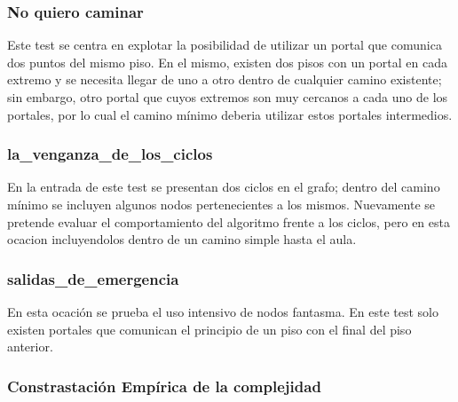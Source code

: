\subsubsection{No quiero caminar}
Este test se centra en explotar la posibilidad de utilizar un portal que comunica dos puntos del mismo piso. En el mismo, existen dos pisos con un portal en cada extremo y se necesita llegar de uno a otro dentro de cualquier camino existente; sin embargo, otro portal que cuyos extremos son muy cercanos a cada uno de los portales, por lo cual el camino mínimo deberia utilizar estos portales intermedios.

\subsubsection{la_venganza_de_los_ciclos}
En la entrada de este test se presentan dos ciclos en el grafo; dentro del camino mínimo se incluyen algunos nodos pertenecientes a los mismos. Nuevamente se pretende evaluar el comportamiento del algoritmo frente a los ciclos, pero en esta ocacion incluyendolos dentro de un camino simple hasta el aula.

\subsubsection{salidas_de_emergencia}
En esta ocación se prueba el uso intensivo de nodos fantasma. En este test solo existen portales que comunican el principio de un piso con el final del piso anterior.

\subsubsection{Constrastación Empírica de la complejidad}
